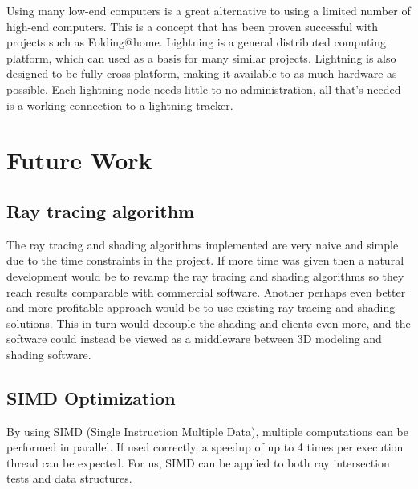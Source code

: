 
Using many low-end computers is a great alternative to using a limited number
of high-end computers. This is a concept that has been proven successful
with projects such as Folding@home. Lightning is a general distributed
computing platform, which can used as a basis for many similar projects.
Lightning is also designed to be fully cross platform, making it available to
as much hardware as possible. Each lightning node needs little to no
administration, all that's needed is a working connection to a lightning
tracker.





\chapter{Future Work}
\section{Ray tracing algorithm}
The ray tracing and shading algorithms implemented are very naive and simple
due to the time constraints in the project. If more time was given then a
natural development would be to revamp the ray tracing and shading algorithms
so they reach results comparable with commercial software. Another perhaps
even better and more profitable approach would be to use existing ray
tracing and shading solutions. This in turn would decouple the shading and
clients even more, and the software could instead be viewed as a middleware
between 3D modeling and shading software.

\section{SIMD Optimization}
By using SIMD (Single Instruction Multiple Data), multiple computations
can be performed in parallel. If used correctly, a speedup of up to 4 times
per execution thread can be expected. For us, SIMD can be applied to both
ray intersection tests and data structures.


